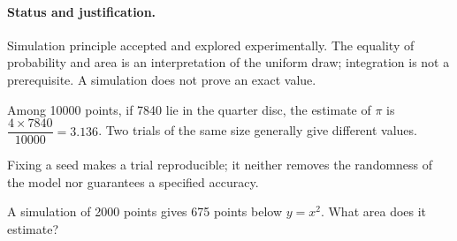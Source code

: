 \paragraph{Status and justification.} Simulation principle accepted and explored experimentally. The equality of probability and area is an interpretation of the uniform draw; integration is not a prerequisite. A simulation does not prove an exact value.
\begin{example}Among 10000 points, if 7840 lie in the quarter disc, the estimate of $\pi$ is $\dfrac{4\times 7840}{10000}=\num{3,136}$. Two trials of the same size generally give different values.\end{example}\label{C05-EX5}
\begin{pitfall}Fixing a seed makes a trial reproducible; it neither removes the randomness of the model nor guarantees a specified accuracy.\end{pitfall}
\begin{application}A simulation of 2000 points gives 675 points below $y=x^2$. What area does it estimate?\end{application}\label{C05-AP5}
\mxnewpage
